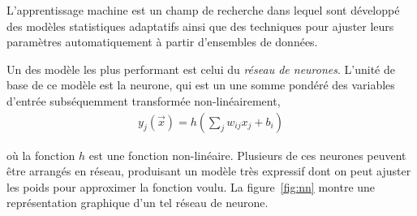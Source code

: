 L'apprentissage machine est un champ de recherche dans lequel sont
développé des modèles statistiques adaptatifs ainsi que des techniques
pour ajuster leurs paramètres automatiquement à partir
d'ensembles de données.

Un des modèle les plus performant est celui du \emph{réseau de
  neurones}. L'unité de base de ce modèle est la neurone, qui est un
une somme pondéré des variables d'entrée subséquemment transformée
non-linéairement,
\begin{eqnarray}
  y_j(\overrightarrow{x}) = h\left(\sum_jw_{ij}x_j + b_i\right)
\end{eqnarray}

\noindent où la fonction $h$ est une fonction non-linéaire. Plusieurs
de ces neurones peuvent être arrangés en réseau, produisant un modèle
très expressif dont on peut ajuster les poids pour approximer la fonction voulu.
La figure~\ref{fig:nn} montre une représentation graphique d'un tel
réseau de neurone.

